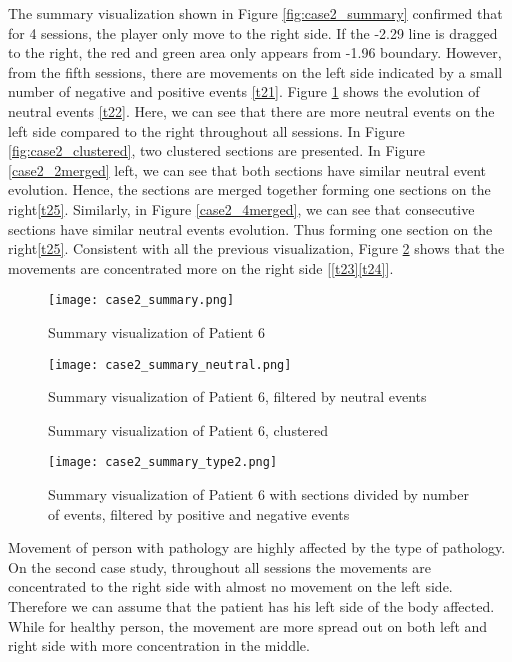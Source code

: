 The summary visualization shown in Figure \ref{fig:case2_summary} confirmed that for 4 sessions, the player only move to the right side. If the -2.29 line is dragged to the right, the red and green area only appears from -1.96 boundary. However, from the fifth sessions, there are movements on the left side indicated by a small number of negative and positive events \ref{t21}. Figure \ref{fig:case2_summary_neutral} shows the evolution of neutral events \ref{t22}. Here, we can see that there are more neutral events on the left side compared to the right throughout all sessions. In Figure \ref{fig:case2_clustered}, two clustered sections are presented. In Figure \ref{case2_2merged} left, we can see that both sections have similar neutral event evolution. Hence, the sections are merged together forming one sections on the right\ref{t25}. Similarly, in Figure \ref{case2_4merged}, we can see that consecutive sections have similar neutral events evolution. Thus forming one section on the right\ref{t25}. Consistent with all the previous visualization, Figure \ref{fig:case2_summary_type2} shows that the movements are concentrated more on the right side [\ref{t23}\ref{t24}].

\begin{figure}[H]
\centering
\texttt{[image: case2\_summary.png]}
\caption{Summary visualization of Patient 6}
\label{fig:case2_summary}
\vspace{1cm}
\texttt{[image: case2\_summary\_neutral.png]}
\caption{Summary visualization of Patient 6, filtered by neutral events}
\label{fig:case2_summary_neutral}
\end{figure}

\begin{figure}[H]%
    \centering
    \qquad
    \caption{Summary visualization of Patient 6, clustered}%
    \label{fig:case2_clustered}%
    \vspace{1cm}
    \texttt{[image: case2\_summary\_type2.png]}
	\caption{Summary visualization of Patient 6 with sections divided by number of events, filtered by positive and negative events}
	\label{fig:case2_summary_type2}
\end{figure}

Movement of person with pathology are highly affected by the type of pathology. On the second case study, throughout all sessions the movements are concentrated to the right side with almost no movement on the left side. Therefore we can assume that the patient has his left side of the body affected. While for healthy person, the movement are more spread out on both left and right side with more concentration in the middle.
